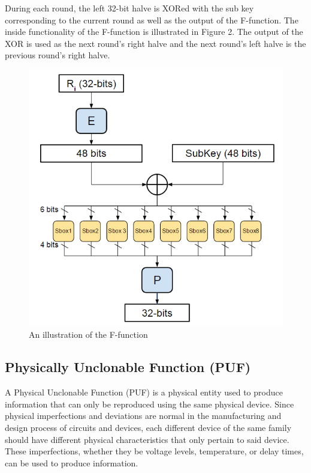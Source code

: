 \documentclass[letterpaper, 10pt, conference]{ieeeconf}  %
\begin{document}
During each round, the left 32-bit halve is XORed with the sub key corresponding to the current round as well as the output of the F-function.  The inside functionality of the F-function is illustrated in Figure 2. The output of the XOR is used as the next round's right halve and the next round's left halve is the previous round's right halve.

\begin{figure}[thpb]
	\centering
	\includegraphics[scale=.50]{Ffunction}
    \caption{An illustration of the F-function}
\end{figure}


\subsection{Physically Unclonable Function (PUF)}

A Physical Unclonable Function (PUF) is a physical entity used to produce information that can only be reproduced using the same physical device.  Since physical imperfections and deviations are normal in the manufacturing and design process of circuits and devices, each different device of the same family should have different physical characteristics that only pertain to said device.  These imperfections, whether they be voltage levels, temperature, or delay times, can be used to produce information.
\end{document}
